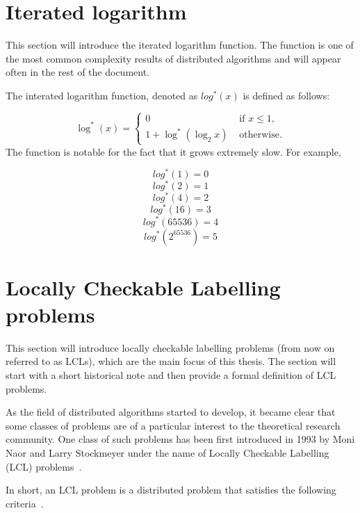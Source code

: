 \section{Iterated logarithm}

This section will introduce the iterated logarithm function. The function is
one of the most common complexity results of distributed algorithms and will
appear often in the rest of the document.

The interated logarithm function, denoted as $log^*(x)$ is defined as follows:

\[
    \log^*(x) = \begin{cases}
        0 & \text{ if $x \le 1$}, \\
        1 + \log^*(\log_2 x) & \text{ otherwise}.
    \end{cases}
\]
The function is notable for the fact that it grows extremely slow. For example,

$$log^*(1) = 0$$
$$log^*(2) = 1$$
$$log^*(4) = 2$$
$$log^*(16) = 3$$
$$log^*(65536) = 4$$
$$log^*(2^{65536}) = 5$$

\section{Locally Checkable Labelling problems}

This section will introduce locally checkable labelling problems (from now on referred to as
LCLs), which are the main focus of this thesis. The section will start with
a short historical note and then provide a formal definition of
LCL problems.

As the field of distributed algorithms started to develop, it became clear
that some classes of problems
are of a particular interest to the theoretical research community.
One class of such problems has been first introduced in 1993 by
Moni Naor and Larry Stockmeyer under the name of Locally Checkable 
Labelling (LCL) problems~\cite{Naor1993}.

In short, an LCL problem is a distributed problem that satisfies the 
following criteria~\cite{Naor1993, Suomela2020}.

